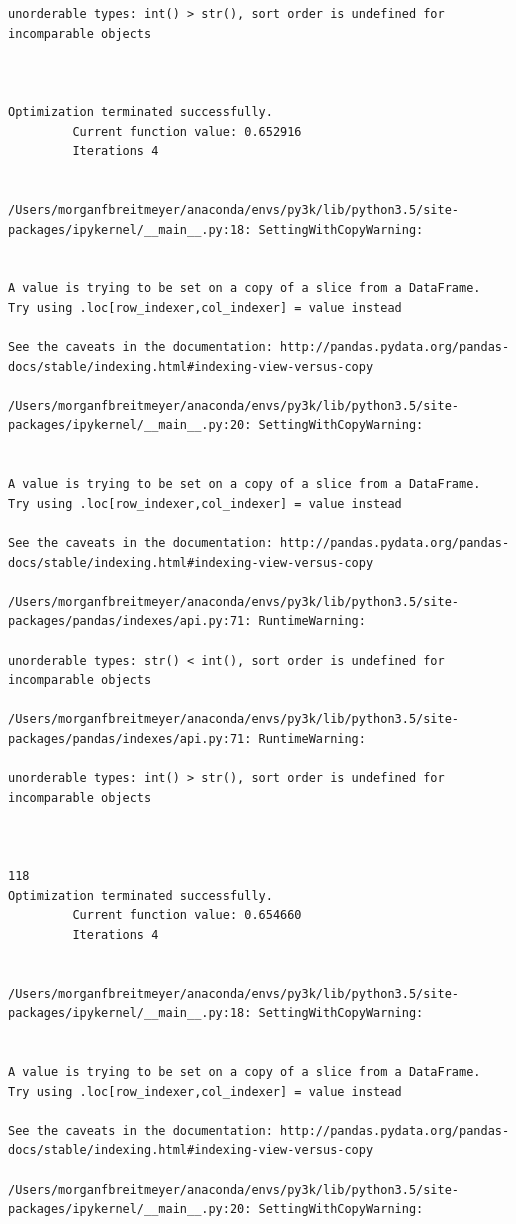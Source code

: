 \begin{lstlisting}
unorderable types: int() > str(), sort order is undefined for incomparable objects



Optimization terminated successfully.
         Current function value: 0.652916
         Iterations 4


/Users/morganfbreitmeyer/anaconda/envs/py3k/lib/python3.5/site-packages/ipykernel/__main__.py:18: SettingWithCopyWarning:


A value is trying to be set on a copy of a slice from a DataFrame.
Try using .loc[row_indexer,col_indexer] = value instead

See the caveats in the documentation: http://pandas.pydata.org/pandas-docs/stable/indexing.html#indexing-view-versus-copy

/Users/morganfbreitmeyer/anaconda/envs/py3k/lib/python3.5/site-packages/ipykernel/__main__.py:20: SettingWithCopyWarning:


A value is trying to be set on a copy of a slice from a DataFrame.
Try using .loc[row_indexer,col_indexer] = value instead

See the caveats in the documentation: http://pandas.pydata.org/pandas-docs/stable/indexing.html#indexing-view-versus-copy

/Users/morganfbreitmeyer/anaconda/envs/py3k/lib/python3.5/site-packages/pandas/indexes/api.py:71: RuntimeWarning:

unorderable types: str() < int(), sort order is undefined for incomparable objects

/Users/morganfbreitmeyer/anaconda/envs/py3k/lib/python3.5/site-packages/pandas/indexes/api.py:71: RuntimeWarning:

unorderable types: int() > str(), sort order is undefined for incomparable objects



118
Optimization terminated successfully.
         Current function value: 0.654660
         Iterations 4


/Users/morganfbreitmeyer/anaconda/envs/py3k/lib/python3.5/site-packages/ipykernel/__main__.py:18: SettingWithCopyWarning:


A value is trying to be set on a copy of a slice from a DataFrame.
Try using .loc[row_indexer,col_indexer] = value instead

See the caveats in the documentation: http://pandas.pydata.org/pandas-docs/stable/indexing.html#indexing-view-versus-copy

/Users/morganfbreitmeyer/anaconda/envs/py3k/lib/python3.5/site-packages/ipykernel/__main__.py:20: SettingWithCopyWarning:



\end{lstlisting}
